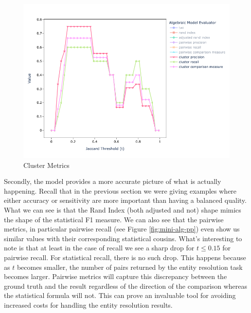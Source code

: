 \documentclass[lettersize,journal]{IEEEtran}
\begin{document}
\begin{figure}
        \begin{minipage}{0.49\textwidth}
            \centering
            \includegraphics[width=\textwidth]{mini-alg-cp}
            \caption{Cluster Metrics}
            \label{fig:mini-alg-cp}
        \end{minipage}    
        
    \end{figure}\label{algebraic-prffig}

    Secondly, the model provides a more accurate picture of what is actually
    happening.
    Recall that in the previous section we were giving examples where either
    accuracy or sensitivity are more important than having a balanced quality.
    What we can see is that the Rand Index (both adjusted and not) shape mimics
    the shape of the statistical F1 measure.
    We can also see that the pairwise metrics, in particular pairwise recall (see Figure \ref{fig:mini-alg-pp}) 
    even show us similar values with their corresponding statistical cousins.
    What's interesting to note is that at least in the case of recall we see a
    sharp drop for $t \leq 0.15$ for pairwise recall.
    For statistical recall, there is no such drop.
    This happens because as $t$ becomes smaller, the number of pairs returned by
    the entity resolution task becomes larger.
    Pairwise metrics will capture this discrepancy between the ground truth and
    the result regardless of the direction of the comparison whereas the
    statistical formula will not.
    This can prove an invaluable tool for avoiding increased costs for handling
    the entity resolution results.
    
\end{document}
